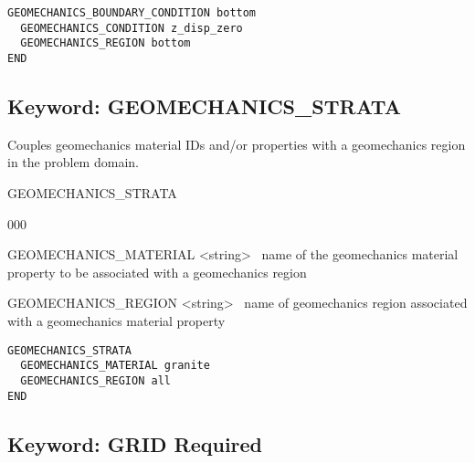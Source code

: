 \begin{mdframed}


\begin{verbatim}
GEOMECHANICS_BOUNDARY_CONDITION bottom
  GEOMECHANICS_CONDITION z_disp_zero
  GEOMECHANICS_REGION bottom
END

\end{verbatim}
\end{mdframed}

\hyperlink{target_key}{\return}



\newpage
\protect\hypertarget{target_geomech_strata}{}
 
\subsection{Keyword: GEOMECHANICS\_STRATA}

Couples geomechanics material IDs and/or properties with a geomechanics region in the problem domain.

\begin{deflist}{00}
\item[GEOMECHANICS\_STRATA] ~
\begin{deflist}{000}
\item[GEOMECHANICS\_MATERIAL] <string> \ name of the geomechanics material property to be associated with a geomechanics region
\item[GEOMECHANICS\_REGION] <string> \ name of geomechanics region associated with a geomechanics material property
\end{deflist}
\item[\keyend]
\end{deflist}

\begin{mdframed}
\begin{verbatim}
GEOMECHANICS_STRATA
  GEOMECHANICS_MATERIAL granite 
  GEOMECHANICS_REGION all
END
\end{verbatim}
\end{mdframed}



\newpage
\protect\hypertarget{target_grid}{}

\subsection{Keyword: GRID \hfill Required}

